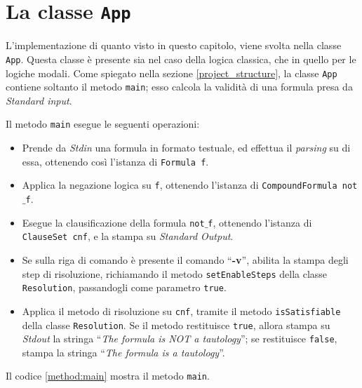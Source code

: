\documentclass[a4paper,12pt]{report}
\begin{document}
\section{La classe \texttt{App}}
\label{class:App}
L'implementazione di quanto visto in questo capitolo, viene svolta nella classe \texttt{App}. Questa classe è presente sia nel caso della logica classica, che in quello per le logiche modali. Come spiegato nella sezione \ref{project_structure}, la classe \texttt{App} contiene soltanto il metodo \texttt{main}; esso calcola la validità di una formula presa da \emph{Standard input}.

Il metodo \texttt{main} esegue le seguenti operazioni:

\begin{itemize}
    \item Prende da \emph{Stdin} una formula in formato testuale, ed effettua il \emph{parsing} su di essa, ottenendo così l'istanza di \texttt{Formula f}.
    \item Applica la negazione logica su \texttt{f}, ottenendo l'istanza di \texttt{CompoundFormula not$\_$f}.
    \item Esegue la clausificazione della formula \texttt{not$\_$f}, ottenendo l'istanza di \texttt{ClauseSet cnf}, e la stampa su \emph{Standard Output}.
    \item Se sulla riga di comando è presente il comando ``\textbf{-v}'', abilita la stampa degli step di risoluzione, richiamando il metodo \texttt{setEnableSteps} della classe \texttt{Resolution}, passandogli come parametro \texttt{true}.
    \item Applica il metodo di risoluzione su \texttt{cnf}, tramite il metodo \texttt{isSatisfiable} della classe \texttt{Resolution}. Se il metodo restituisce \texttt{true}, allora stampa su \emph{Stdout} la stringa ``\emph{The formula is NOT a tautology}''; se restituisce \texttt{false}, stampa la stringa ``\emph{The formula is a tautology}''.
\end{itemize}
Il codice \ref{method:main} mostra il metodo \texttt{main}.
\end{document}
